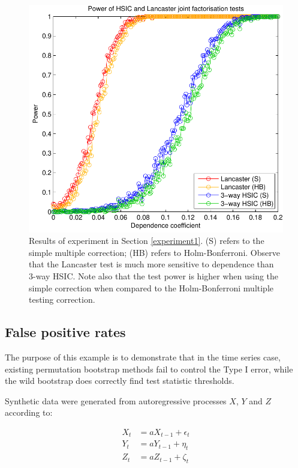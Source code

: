 \documentclass[]{article}
\begin{document}
\begin{figure}[ht]
\vskip 0.2in
\begin{center}
\centerline{\includegraphics[scale=0.6]{UAI_Figure1.pdf}}
\caption{Results of experiment in Section \ref{experiment1}. (S) refers to the simple multiple correction; (HB) refers to Holm-Bonferroni. Observe that the Lancaster test is much more sensitive to dependence than 3-way HSIC. Note also that the test power is higher when using the simple correction when compared to the Holm-Bonferroni multiple testing correction.}
\label{weak-pairwise-strong-joint}
\end{center}
\vskip -0.2in
\end{figure} 

\subsection{False positive rates}\label{experiment2}

The purpose of this example is to demonstrate that in the time series case, existing permutation bootstrap methods fail to control the Type I error, while the  wild bootstrap does correctly find test statistic thresholds.

Synthetic data were generated from autoregressive processes $X$, $Y$ and $Z$ according to:

\begin{align*}
X_t &= aX_{t-1} + \epsilon_t\\
Y_t &= aY_{t-1} + \eta_t\\
Z_t &= aZ_{t-1} +  \zeta_t\\
\end{align*}
\end{document}
